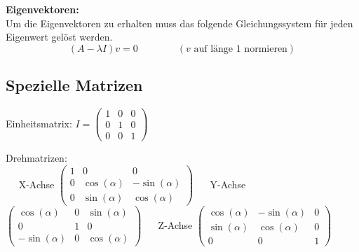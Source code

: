 \textbf{Eigenvektoren:}\\
Um die Eigenvektoren zu erhalten muss das folgende Gleichungssystem für jeden
Eigenwert gelöst werden.
\[ 
	(A-\lambda I)v=0 \qquad \qquad (v \text{ auf länge 1 normieren})
\]

\subsection{Spezielle Matrizen}
Einheitsmatrix: 
$I= \begin{pmatrix} 
1 & 0 & 0 \\
0 & 1 & 0 \\
0 & 0 & 1
\end{pmatrix}$

\vspace{0.5cm}

Drehmatrizen:
\\
$\quad$
X-Achse
$\begin{pmatrix} 
	1 & 0 & 0 \\
	0 & \cos(\alpha) & -\sin(\alpha) \\
	0 & \sin(\alpha) & \cos(\alpha)
\end{pmatrix}$
$\quad$
Y-Achse
$\begin{pmatrix} 
	\cos(\alpha) & 0 & \sin(\alpha) \\
	0 & 1 & 0 \\
	-\sin(\alpha) & 0 & \cos(\alpha)
\end{pmatrix}$
$\quad$
Z-Achse
$\begin{pmatrix} 
	\cos(\alpha) & -\sin(\alpha) & 0 \\
	\sin(\alpha) & \cos(\alpha) & 0 \\
	0 & 0 & 1
\end{pmatrix}$
